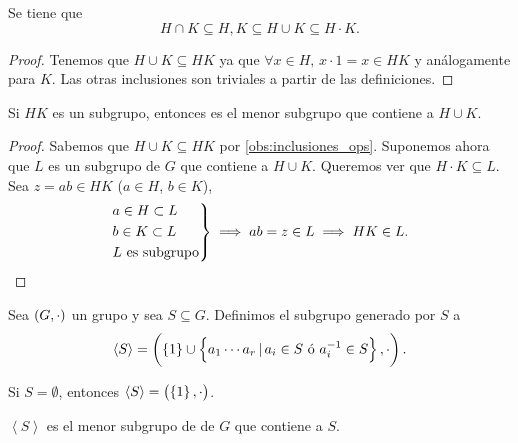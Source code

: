 \begin{obs} \label{obs:inclusiones_ops}
    Se tiene que
    \[
        H \cap K \subseteq H, K \subseteq H \cup K \subseteq H \cdot K.
    \]
\end{obs}

\begin{proof}
    Tenemos que $H \cup K \subseteq HK$ ya que $\forall x \in H, \, x\cdot1 = x \in HK$
    y análogamente para $K$. Las otras inclusiones son triviales a partir de las definiciones.
\end{proof}

\begin{obs}
    Si $HK$ es un subgrupo, entonces es el menor subgrupo que contiene a $H \cup K$. 
\end{obs}

\begin{proof}
    Sabemos que $H \cup K \subseteq HK$ por \ref{obs:inclusiones_ops}.
    Suponemos ahora que $L$ es un subgrupo de $G$ que contiene a $H \cup K$. Queremos ver que
    $ H \cdot K \subseteq L$. Sea $z = ab \in HK$ ($a \in H$, $b \in K$),
    \[
        \begin{rcases}
            a \in H \subset L \\
            b \in K \subset L \\
            L \text{ es subgrupo}
        \end{rcases}
        \implies ab = z \in L \implies HK \in L.
    \]
\end{proof}

\begin{defi}
        Sea $\left( G, \cdot\right)$ un grupo y sea $S\subseteq G$. Definimos el subgrupo generado por $S$ a
        \[
            \left<S\right> = \left( \left\{ 1 \right\} \cup \left\{a_1 \cdots a_r \,\vert\, a_i \in S \text{ ó } a^{-1}_i \in S\right\}, \cdot \right).
        \]
\end{defi}

\begin{obs}
    Si $S = \emptyset$, entonces $\left<S\right> = \left( \left\{1\right\}, \cdot \right)$.
\end{obs}

\begin{obs}
    $\left<S\right>$ es el menor subgrupo de de $G$ que contiene a $S$.
\end{obs}

